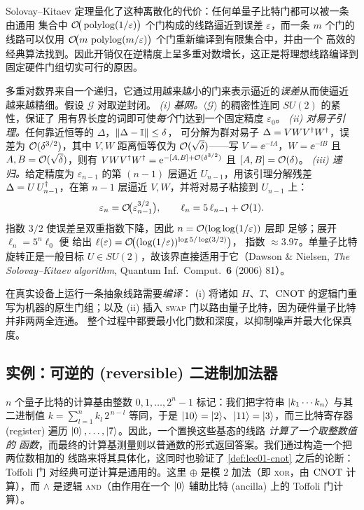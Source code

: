 \begin{remark}
Solovay--Kitaev 定理量化了这种离散化的代价：任何单量子比特门都可以被一条由通用
集合中 $\mathcal{O}\!\big(\operatorname{polylog}(1/\varepsilon)\big)$ 个门构成的线路逼近到误差
$\varepsilon$，而一条 $m$ 个门的线路可以仅用
$\mathcal{O}\!\big(m\,\operatorname{polylog}(m/\varepsilon)\big)$ 个门重新编译到有限集合中，并由一个
高效的经典算法找到。因此开销仅在逆精度上呈多重对数增长，这正是将理想线路编译到
固定硬件门组切实可行的原因。
\end{remark}

\begin{remark}\label{rem:lec01-sk-sketch}
多重对数界来自一个递归，它通过用越来越小的门来表示逼近的\emph{误差}从而使逼近
越来越精细。假设 $\mathcal{G}$ 对取逆封闭。
\emph{(i) 基网。}$\langle\mathcal{G}\rangle$ 的稠密性连同 $SU(2)$ 的紧性，保证了
用有界长度的词即可使\emph{每个}门达到一个固定精度 $\varepsilon_0$。
\emph{(ii) 对易子引理。}任何靠近恒等的 $\Delta$，$\left\lVert \Delta-\mathbb{I} \right\rVert\le\delta$，
可分解为群对易子 $\Delta=VWV^{\dagger} W^{\dagger}$，误差为 $\mathcal{O}(\delta^{3/2})$，其中
$V,W$ 距离恒等仅为 $\mathcal{O}(\sqrt{\delta})$——写
$V=\ee^{-\ii A}$，$W=\ee^{-\ii B}$ 且 $A,B=\mathcal{O}(\sqrt{\delta})$，则有
$VWV^{\dagger} W^{\dagger}=\mathrm{e}^{-[A,B]+\mathcal{O}(\delta^{3/2})}$ 且 $[A,B]=\mathcal{O}(\delta)$。
\emph{(iii) 递归。}给定精度为 $\varepsilon_{n-1}$ 的第 $(n{-}1)$ 层逼近
$U_{n-1}$，用该引理分解残差 $\Delta=U\,U_{n-1}^{\dagger}$，在第 $n{-}1$ 层逼近
$V,W$，并将对易子粘接到 $U_{n-1}$ 上：
\[
  \varepsilon_n=\mathcal{O}\!\big(\varepsilon_{n-1}^{3/2}\big),\qquad
  \ell_n=5\,\ell_{n-1}+\mathcal{O}(1).
\]
指数 $3/2$ 使误差呈双重指数下降，因此 $n=\mathcal{O}(\log\log(1/\varepsilon))$ 层即
足够；展开 $\ell_n=5^{n}\ell_0$ 便
给出 $\ell(\varepsilon)=\mathcal{O}\!\big((\log(1/\varepsilon))^{\log 5/\log(3/2)}\big)$，
指数 $\approx 3.97$。单量子比特旋转正是一般目标
$U\in SU(2)$，故该界直接适用于它（Dawson \& Nielsen,
\emph{The Solovay--Kitaev algorithm}, Quantum Inf.\ Comput.\ \textbf{6} (2006) 81）。
\end{remark}

在真实设备上运行一条抽象线路需要\emph{编译}：
(i) 将诸如 $H$、$T$、$\mathrm{CNOT}$ 的逻辑门重写为机器的原生门组；以及
(ii) 插入 \textsc{swap} 门以路由量子比特，因为硬件量子比特并非两两全连通。
整个过程中都要最小化门数和深度，以抑制噪声并最大化保真度。
\subsection{实例：可逆的 (reversible) 二进制加法器}
\label{sec:lec01-adder}

$n$ 个量子比特的计算基由整数 $0,1,\dots,2^{n}-1$ 标记：我们把字符串
$\ket{k_1\cdots k_n}$ 与其二进制值 $k=\sum_{l=1}^{n}k_l\,2^{\,n-l}$ 等同，于是
$\ket{10}=\ket{2}$、$\ket{11}=\ket{3}$，而三比特寄存器 (register) 遍历
$\ket{0},\dots,\ket{7}$。因此，一个置换这些基态的线路 \emph{计算了一个取整数值的
函数}，而最终的计算基测量则以普通数的形式返回答案。我们通过构造一个把两位数相加的
线路来将其具体化，这同时也验证了 \cref{def:lec01-cnot} 之后的论断：Toffoli 门
对经典可逆计算是通用的。这里 $\oplus$ 是模 $2$ 加法（即 \textsc{xor}，由 $\mathrm{CNOT}$
计算），而 $\wedge$ 是逻辑 \textsc{and}（由作用在一个 $\ket{0}$ 辅助比特 (ancilla)
上的 Toffoli 门计算）。


